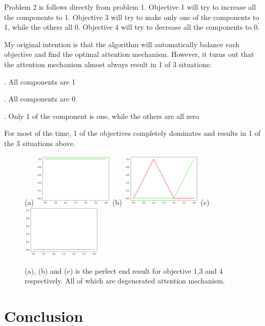 \documentclass{article}
\begin{document}
	\quad Problem 2 is follows directly from problem 1. Objective 1 will try to increase all the components to 1. Objective 3 will try to make only one of the components to 1, while the others all 0. Objective 4 will try to decrease all the components to 0.
	
	\quad My original intention is that the algorithm will automatically balance each objective and find the optimal attention mechanism. However, it turns out that the attention mechanism almost always result in 1 of 3 situations:
	
	. All components are 1
	
	. All components are 0
	
	. Only 1 of the component is one, while the others are all zero
	
	\quad For most of the time, 1 of the objectives completely dominates and results in 1 of the 3 situations above.
	\begin{figure}[h]
		\centering
		\small{(a)}
		\includegraphics[width=1.5in]{all1s.png}
		\hspace{0.2in}
		\small{(b)}
		\includegraphics[width=1.5in]{entropyMin.png}
		\hspace{0.2in}
		\small{(c)}
		\includegraphics[width=1.5in]{all0s.png}
		\caption{(a), (b) and (c) is the perfect end result for objective 1,3 and 4 respectively. All of which are degenerated attention mechanism.}
	\end{figure}
	\section{Conclusion}
\end{document}
